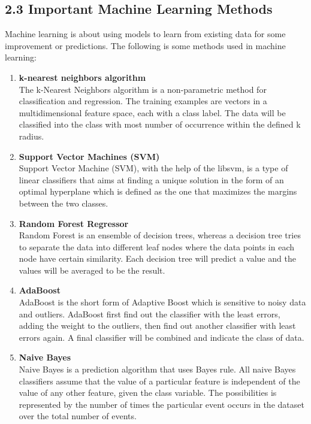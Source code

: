 \documentclass{article}
\begin{document}
	\subsection{2.3 Important Machine Learning Methods}
	Machine learning is about using models to learn from existing data for some improvement or predictions. 
	The following is some methods used in machine learning:
	\begin{enumerate}
		\item \textbf{k-nearest neighbors algorithm} \\
		The k-Nearest Neighbors algorithm is a non-parametric method for classification and regression. 
		The training examples are vectors in a multidimensional feature space, each with a class label. 
		The data will be classified into the class with most number of occurrence within the defined k radius.
	
		\item \textbf{Support Vector Machines (SVM)} \\
		Support Vector Machine (SVM), with the help of the libsvm, is a type of linear classiﬁers that aims at ﬁnding 
		a unique solution in the form of an optimal hyperplane which is deﬁned as the one that maximizes the margins between the two classes.

	
		\item \textbf{Random Forest Regressor} \\
		Random Forest is an ensemble of decision trees, whereas a decision tree tries to separate the data into different leaf nodes 
		where the data points in each node have certain similarity. Each decision tree will predict a value and the values will be averaged to be the result.
	
		\item \textbf{AdaBoost} \\
		AdaBoost is the short form of Adaptive Boost which is sensitive to noisy data and outliers. 
		AdaBoost first find out the classifier with the least errors, adding the weight to the outliers, then find out another classifier with least errors again.
		A final classifier will be combined and indicate the class of data.

	
		\item \textbf{Naive Bayes} \\ 
		Naive Bayes is a prediction algorithm that uses Bayes rule. 
		All naive Bayes classifiers assume that the value of a particular feature is independent of the value of any other feature, given the class variable. 
		The possibilities is represented by the number of times the particular event occurs in the dataset over the total number of events. 
	\end{enumerate}
\end{document}

